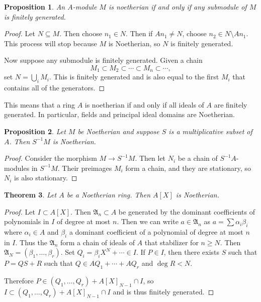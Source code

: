 \documentclass[leqno, openany]{memoir}
\newtheorem{thm}{Theorem}[section]
\newtheorem{prop}[thm]{Proposition}
\theoremstyle{definition}
\theoremstyle{remark}
\theoremstyle{plain}
\theoremstyle{definition}
\theoremstyle{remark}
\newcommand{\mf}[1]{\mathfrak{#1}}
\begin{document}
\begin{prop} An $A$-module $M$ is noetherian if and only if any submodule of
$M$ is finitely generated.  \end{prop}

\begin{proof} Let $N \subseteq M$. Then choose $n_1 \in N$. Then if $A n_1 \neq
    N$, choose $n_2 \in N \setminus A n_1$. This process will stop because $M$
    is Noetherian, so $N$ is finitely generated.

    Now suppose any submodule is finitely generated. Given a chain \[ M_1
    \subset M_2 \subset \cdots \subset M_n \subset \cdots, \] set $N =
    \bigcup_i M_i$. This is finitely generated and is also equal to the first
    $M_i$ that contains all of the generators.  \end{proof}

This means that a ring $A$ is noetherian if and only if all ideals of $A$ are
finitely generated. In particular, fields and principal ideal domains are
Noetherian.

\begin{prop} Let $M$ be Noetherian and suppose $S$ is a multiplicative subset
of $A$. Then $S^{-1}M$ is Noetherian.  \end{prop}

\begin{proof} Consider the morphism $M \to S^{-1}M$. Then let $N_i$ be a chain
of $S^{-1}A$-modules in $S^{-1}M$. Their preimages $M_i$ form a chain, and they
are stationary, so $N_i$ is also stationary.  \end{proof}

\begin{thm} Let $A$ be a Noetherian ring. Then $A[X]$ is Noetherian.  \end{thm}

\begin{proof} Let $I \subset A[X]$. Then $\mf{A}_n \subset A$ be generated by
    the dominant coefficients of polynomials in $I$ of degree at most $n$. Then
    we can write $a \in \mf{A}_n$ as $a = \sum \alpha_i \beta_i$ where
    $\alpha_i \in A$ and $\beta_i$ a dominant coefficient of a polynomial of
    degree at most $n$ in $I$. Thus the $\mf{A}_n$ form a chain of ideals of
    $A$ that stabilizer for $n \geq N$. Then $\mf{A}_N = (\beta_1, \ldots,
    \beta_r)$. Set $Q_i = \beta_i X^N + \cdots \in I$. If $P \in I$, then there
    exists $S$ such that $P = QS+R$ such that $Q \in A Q_1 + \cdots + A Q_r$
    and $\deg R < N$.

    Therefore $P \in (Q_1, \ldots, Q_r) + A[X]_{N-1} \cap I$, so $I \subset
(Q_1, \ldots, Q_r) + A[X]_{N-1} \cap I$ and is thus finitely generated.
\end{proof}
\end{document}
